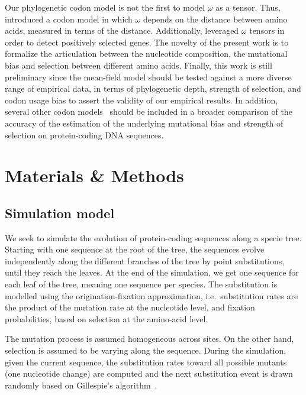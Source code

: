 \documentclass{article}
\begin{document}
Our phylogenetic codon model is not the first to model $\omega$ as a tensor.
Thus, \citet{Yang1998a} introduced a codon model in which $\omega$ depends on the distance between amino acids, measured in terms of the \citet{Grantham1974} distance.
Additionally, \citet{Tang2006} leveraged  $\omega$ tensors in order to detect positively selected genes.
The novelty of the present work is to formalize the articulation between the nucleotide composition, the mutational bias and selection between different amino acids.
Finally, this work is still preliminary since the mean-field model should be tested against a more diverse range of empirical data, in terms of phylogenetic depth, strength of selection, and {codon usage bias} to assert the validity of our empirical results.
In addition, several other codon models~\citep{Rodrigue2008a,KosakovskyPond2020} should be included in a broader comparison of the accuracy of the estimation of the underlying mutational bias and strength of selection on protein-coding {DNA} sequences.

\section{Materials \& Methods}

\subsection{Simulation model}
\label{sec:mut-bias-simu}
We seek to simulate the evolution of protein-coding sequences along a specie tree.
Starting with one sequence at the root of the tree, the sequences evolve independently along the different branches of the tree by point {substitutions}, until they reach the leaves.
At the end of the simulation, we get one sequence for each leaf of the tree, meaning one sequence per species.
The {substitution} is modelled using the origination-fixation approximation, i.e.~substitution rates are the product of the mutation rate at the nucleotide level, and fixation probabilities, based on selection at the amino-acid level.

The mutation process is assumed homogeneous across sites.
On the other hand, selection is assumed to be varying along the sequence.
During the simulation, given the current sequence, the {substitution} rates toward all possible mutants (one nucleotide change) are computed and the next {substitution} event is drawn randomly based on Gillespie's algorithm~\citep{Gillespie1977}.
\end{document}
